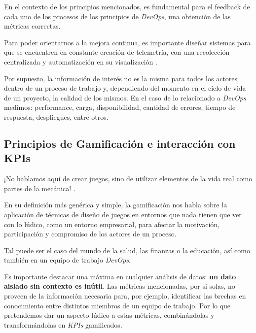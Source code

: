 \documentclass[journal]{IEEEtran}
\begin{document}
En el contexto de los principios mencionados, es fundamental para el feedback de cada uno de los procesos de los principios de \textit{DevOps}, una obtención de las métricas correctas. 

Para poder orientarnos a la mejora continua, es importante diseñar sistemas para que se encuentren en constante creación de telemetría, con una recolección centralizada y automatización en su visualización \cite[Part IV. 14.]{kim2021devops}.

Por supuesto, la información de interés no es la misma para todos los actores dentro de un proceso de trabajo y, dependiendo del momento en el ciclo de vida de un proyecto\cite{brunnert2015performance}, la calidad de los mismos. En el caso de lo relacionado a \textit{DevOps} medimos: performance, carga, disponibilidad, cantidad de errores, tiempo de respuesta, despliegues, entre otros.

\subsection{\textbf{Principios de Gamificación e interacción con KPIs}}
\begin{tcolorbox}[colback=gray!10, colframe=black, left=2mm, right=2mm]
    \small %
    \ttfamily %
    \raggedright %
    ¡No hablamos aquí de crear juegos, sino de utilizar elementos de la vida real como partes de la mecánica! \cite{nallar2015estructuraludica}.
\end{tcolorbox}

En su definición más genérica y simple, la gamificación nos habla sobre la aplicación de técnicas de diseño de juegos en entornos que nada tienen que ver con lo lúdico, como un entorno empresarial, para afectar la motivación, participación y compromiso de los actores de un proceso.

Tal puede ser el caso del mundo de la salud, las finanzas o la educación, así como también en un equipo de trabajo \textit{DevOps}.

Es importante destacar una máxima en cualquier análisis de datos: \textbf{un dato aislado sin contexto es inútil}. Las métricas mencionadas, por si solas, no proveen de la información necesaria para, por ejemplo, identificar las brechas en conocimiento entre distintos miembros de un equipo de trabajo. Por lo que pretendemos dar un aspecto lúdico a estas métricas, combinándolas y transformándolas en \textit{KPIs} gamificados. 
\end{document}
